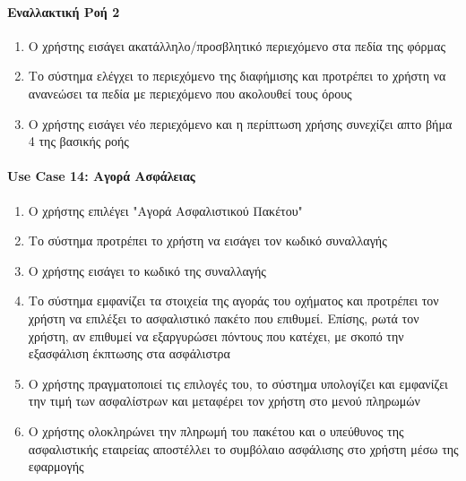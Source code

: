 \documentclass{../ol-softwaremanual}
\begin{document}
\paragraph{Εναλλακτική Ροή 2}
\begin{enumerate}
\item Ο χρήστης εισάγει ακατάλληλο/προσβλητικό περιεχόμενο στα πεδία της φόρμας
\item Το σύστημα ελέγχει το περιεχόμενο της διαφήμισης και προτρέπει το χρήστη να ανανεώσει τα πεδία 
με περιεχόμενο που ακολουθεί τους όρους 
\item Ο χρήστης εισάγει νέο περιεχόμενο και η περίπτωση χρήσης συνεχίζει απτο βήμα 4 της βασικής ροής
\end{enumerate}

\paragraph{\en Use Case 14: \gr Αγορά Ασφάλειας}
\begin{enumerate}
    \item Ο χρήστης επιλέγει \en"\gr Αγορά Ασφαλιστικού Πακέτου\en"\gr
    \item Το σύστημα προτρέπει το χρήστη να εισάγει τον κωδικό συναλλαγής
    \item Ο χρήστης εισάγει το κωδικό της συναλλαγής
    \item Το σύστημα εμφανίζει τα στοιχεία της αγοράς του οχήματος και προτρέπει τον χρήστη να επιλέξει το ασφαλιστικό πακέτο που επιθυμεί. Επίσης, ρωτά τον χρήστη, αν επιθυμεί να εξαργυρώσει πόντους που κατέχει, με σκοπό την εξασφάλιση έκπτωσης στα ασφάλιστρα
    \item Ο χρήστης πραγματοποιεί τις επιλογές του, το σύστημα υπολογίζει και εμφανίζει την τιμή των ασφαλίστρων και μεταφέρει τον χρήστη στο μενού πληρωμών
    \item Ο χρήστης ολοκληρώνει την πληρωμή του πακέτου και ο υπεύθυνος της ασφαλιστικής εταιρείας αποστέλλει το συμβόλαιο ασφάλισης στο χρήστη μέσω της εφαρμογής 
\end{enumerate}
\end{document}
